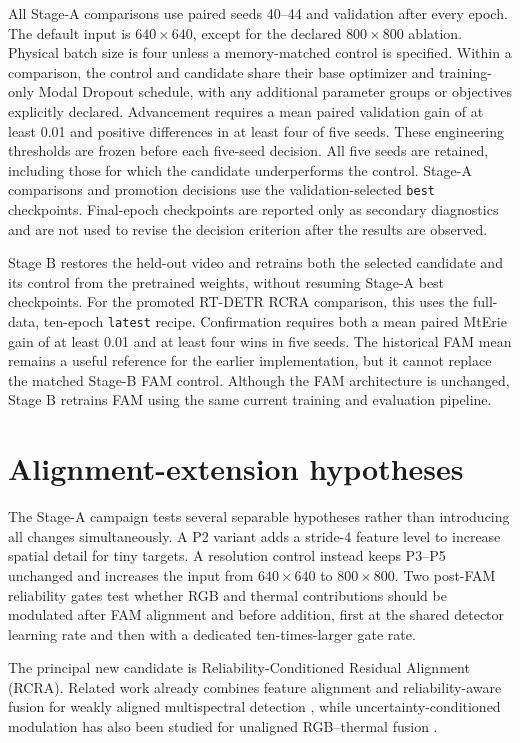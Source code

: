 All Stage-A comparisons use paired seeds 40--44 and validation after every
epoch. The default input is \(640\times640\), except for the declared
\(800\times800\) ablation. Physical batch size is four unless a memory-matched
control is specified. Within a comparison, the control and candidate share
their base optimizer and training-only Modal Dropout schedule, with any
additional parameter groups or objectives explicitly declared.
Advancement requires a mean paired validation gain of at least 0.01 and positive
differences in at least four of five seeds. These engineering thresholds are
frozen before each five-seed decision. All five seeds are retained, including
those for which the candidate underperforms the control. Stage-A comparisons
and promotion decisions use the validation-selected \texttt{best} checkpoints.
Final-epoch checkpoints are reported only as secondary diagnostics and are not
used to revise the decision criterion after the results are observed.

Stage B restores the held-out video and retrains both the selected candidate
and its control from the pretrained weights, without resuming Stage-A best
checkpoints. For the promoted RT-DETR RCRA comparison, this uses the
full-data, ten-epoch \texttt{latest} recipe. Confirmation requires
both a mean paired MtErie gain of at least 0.01 and at least four wins in five
seeds. The historical FAM mean remains a useful reference for the earlier
implementation, but it cannot replace the matched Stage-B FAM control. Although
the FAM architecture is unchanged, Stage B retrains FAM using the same current
training and evaluation pipeline.

\section{Alignment-extension hypotheses}

The Stage-A campaign tests several separable hypotheses rather than introducing
all changes simultaneously. A P2 variant adds a stride-4 feature level to
increase spatial detail for tiny targets. A resolution control instead keeps
P3--P5 unchanged and increases the input from \(640\times640\) to
\(800\times800\). Two post-FAM reliability gates test whether RGB and thermal
contributions should be modulated after FAM alignment and before addition,
first at the shared detector learning rate and then with a dedicated
ten-times-larger gate rate.

The principal new candidate is Reliability-Conditioned Residual Alignment
(RCRA). Related work already combines feature alignment and reliability-aware
fusion for weakly aligned multispectral detection \cite{zhang2019arcnn,chen2024oafa},
while uncertainty-conditioned modulation has also been studied for unaligned
RGB--thermal fusion \cite{wang2026umfnet}.

